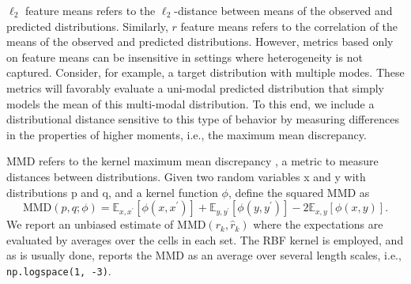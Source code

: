 $\ell_2$ feature means refers to the $\ell_2$-distance between means of the observed and predicted distributions. Similarly, $r$ feature means refers to the correlation of the means of the observed and predicted distributions.
However, metrics based only on feature means can be insensitive in settings where heterogeneity is not captured. Consider, for example, a target distribution with multiple modes. These metrics will favorably evaluate a uni-modal predicted distribution that simply models the mean of this multi-modal distribution. To this end, we include a distributional distance sensitive to this type of behavior by measuring differences in the properties of higher moments, i.e., the maximum mean discrepancy.

MMD refers to the kernel maximum mean discrepancy \citep{gretton2012}, a metric to measure distances between distributions.
Given two random variables x and y with distributions p and q, and a kernel function $\phi$, \citet{gretton2012} define the squared MMD as
\begin{equation*}
    \text{MMD}(p, q; \phi) = \mathbb{E}_{x,x^\prime}[\phi(x, x^\prime)] + \mathbb{E}_{y,y^\prime}[\phi(y, y^\prime)] - 2\mathbb{E}_{x,y}[\phi(x, y)].
\end{equation*}
We report an unbiased estimate of $\text{MMD}(r_k, \hat{r}_k)$ where the expectations are evaluated by averages over the cells in each set. The RBF kernel is employed, and as is usually done, reports the MMD as an average over several length scales, i.e., \texttt{np.logspace(1, -3)}.

